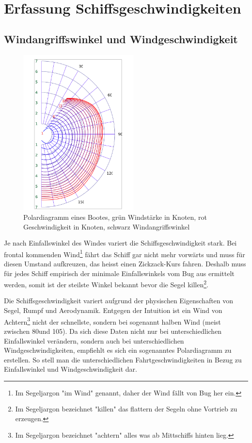 
\section{Erfassung Schiffsgeschwindigkeiten}

\subsection{Windangriffswinkel und Windgeschwindigkeit}

\begin{figure} 
\centering
\includegraphics[width=6cm]{img/polardiagramm}
\caption{Polardiagramm eines Bootes, grün Windstärke in Knoten, rot
Geschwindigkeit in Knoten, schwarz Windangriffswinkel}
\label{polardiagram}
\end{figure}

Je nach Einfallswinkel des Windes variert die Schiffsgeschwindigkeit stark.
Bei frontal kommenden Wind\footnote{Im Segeljargon "im Wind" genannt, daher
der Wind fällt von Bug her ein.} fährt das Schiff gar nicht mehr vorwärts und
muss für diesen Umstand aufkreuzen, das heisst einen Zickzack-Kurs fahren.
Deshalb muss für jedes Schiff empirisch der minimale Einfallswinkels vom Bug
aus ermittelt werden, somit ist der steilste Winkel bekannt bevor die Segel
killen\footnote{Im Segeljargon bezeichnet "killen" das flattern der Segeln
ohne Vortrieb zu erzeugen.}.

Die Schiffsgeschwindigkeit variert aufgrund der physischen Eigenschaften von
Segel, Rumpf und Aerodynamik. Entgegen der Intuition ist ein Wind von
Achtern\footnote{Im Segeljargon bezeichnet "achtern" alles was ab Mittschiffs
hinten lieg.} nicht der schnellste, sondern bei sogenannt halben Wind (meist
zwischen 80\degree und 105\degree). Da sich diese Daten nicht nur bei
unterschiedlichen Einfallswinkel verändern, sondern auch bei unterschiedlichen
Windgeschwindigkeiten, empfiehlt es sich ein sogenanntes Polardiagramm zu
erstellen. So stell man die unterschiedlichen Fahrtgeschwindigkeiten in Bezug
zu Einfallswinkel und Windgeschwindigkeit dar.

